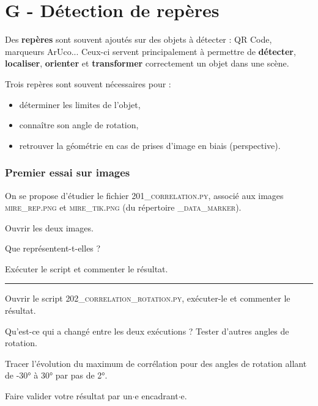 \documentclass[a4paper,12pt,titlepage]{article} %
\begin{document}
\bigskip

\section{G - Détection de repères}

Des \textbf{repères} sont souvent ajoutés sur des objets à détecter : QR Code, marqueurs ArUco... Ceux-ci servent principalement à permettre de \textbf{détecter}, \textbf{localiser}, \textbf{orienter} et \textbf{transformer} correctement un objet dans une scène.

\medskip

Trois repères sont souvent nécessaires pour :
\begin{itemize}
	\item déterminer les limites de l'objet,
	\item connaître son angle de rotation,
	\item retrouver la géométrie en cas de prises d'image en biais (perspective).
\end{itemize}

\subsubsection{Premier essai sur images}

On se propose d'étudier le fichier \textsc{201\_correlation.py}, associé aux images \textsc{mire\_rep.png} et \textsc{mire\_tik.png} (du répertoire \textsc{\_data\_marker}).

\Manip Ouvrir les deux images. 

\Quest Que représentent-t-elles ?

\Manip Exécuter le script et commenter le résultat.

\noindent \rule{\linewidth}{1pt}

\Manip Ouvrir le script \textsc{202\_correlation\_rotation.py}, exécuter-le et commenter le résultat.

\Quest Qu'est-ce qui a changé entre les deux exécutions ? Tester d'autres angles de rotation.

\Manip Tracer l'évolution du maximum de corrélation pour des angles de rotation allant de -30° à 30° par pas de 2°.

\bigskip

\begin{mdframed}[style=sidebar,frametitle={}]
\large
Faire valider votre résultat par un$\cdot$e encadrant$\cdot$e.
\end{mdframed}
\end{document}

